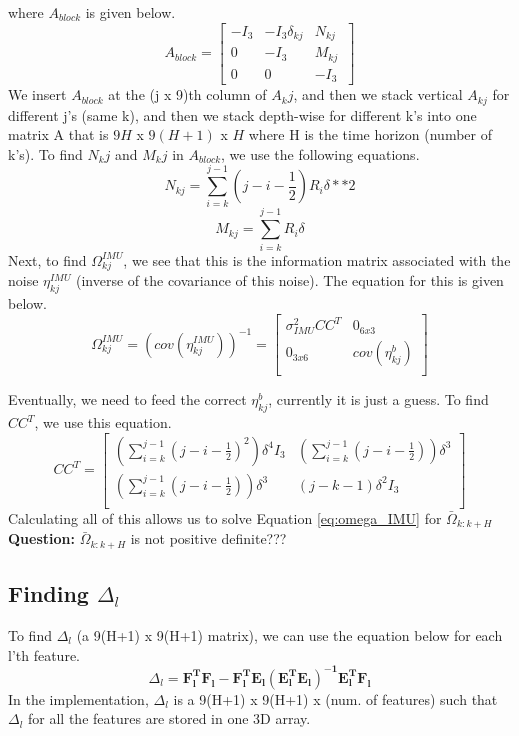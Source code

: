 \documentclass{article}
\begin{document}
where $A_{block}$ is given below.
\[A_{block} = 
\begin{bmatrix}
-I_3 & -I_3\delta_{kj} & N_{kj} \\
0 & -I_3 & M_{kj} \\
0 & 0 & -I_3 \
\end{bmatrix}\]
We insert $A_{block}$ at the (j x 9)th column of $A_kj$, and then we stack vertical $A_{kj}$ for different j's (same k), and then we stack depth-wise for different k's into one matrix A that is $9H$ x $9(H+1)$ x $H$ where H is the time horizon (number of k's). To find $N_kj$ and $M_kj$ in $A_{block}$, we use the following equations. 
\begin{equation}
    N_{kj} = \sum_{i=k}^{j-1}(j-i-\frac{1}{2})R_i\delta**2
\end{equation}
\begin{equation}
    M_{kj} = \sum_{i=k}^{j-1}R_i\delta
\end{equation}
Next, to find $\Omega_{kj}^{IMU}$, we see that this is the information matrix associated with the noise $\eta_{kj}^{IMU}$ (inverse of the covariance of this noise). The equation for this is given below. 
\[\Omega_{kj}^{IMU} = (cov(\eta_{kj}^{IMU}))^{-1} =
\begin{bmatrix}
\sigma_{IMU}^2CC^T & 0_{6x3} \\
0_{3x6} & cov(\eta_{kj}^b) \\
\end{bmatrix}
\]

Eventually, we need to feed the correct $\eta_{kj}^b$, currently it is just a guess. To find $CC^T$, we use this equation.
\[CC^T =
\begin{bmatrix}
(\sum_{i=k}^{j-1}(j-i-\frac{1}{2})^2)\delta^4 I_3 & (\sum_{i=k}^{j-1}(j-i-\frac{1}{2}))\delta^3 \\
(\sum_{i=k}^{j-1}(j-i-\frac{1}{2}))\delta^3  &
(j-k-1)\delta^2I_3 \\
\end{bmatrix}
\]
Calculating all of this allows us to solve Equation \ref{eq:omega_IMU} for $\bar{\Omega}_{k:k+H}$ \\
\textbf{Question: } $\bar{\Omega}_{k:k+H}$ is not positive definite???
\subsection{Finding $\Delta_l$}
To find $\Delta_l$ (a 9(H+1) x 9(H+1) matrix), we can use the equation below for each l'th feature. 
\begin{equation}
    \Delta_l = \mathbf{F_l^TF_l - F_l^TE_l(E_l^TE_l)^{-1}E_l^TF_l}
\end{equation}
In the implementation, $\Delta_l$ is a 9(H+1) x 9(H+1) x (num. of features) such that $\Delta_l$ for all the features are stored in one 3D array.\\
\end{document}
